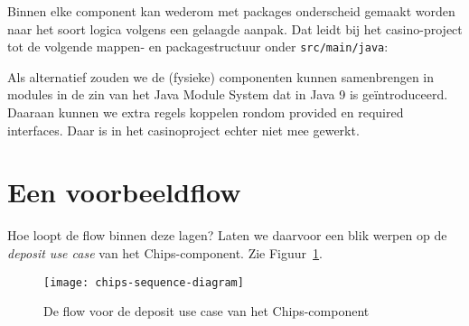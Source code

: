 Binnen elke component kan wederom met packages 
onderscheid gemaakt worden naar 
het soort logica volgens een gelaagde aanpak. 
Dat leidt bij het casino-project tot de volgende 
mappen- en packagestructuur onder \texttt{src/main/java}:


Als alternatief zouden we de (fysieke) componenten kunnen samenbrengen in 
modules in de zin van het Java Module System dat in Java 9 is geïntroduceerd.
Daaraan kunnen we extra regels koppelen rondom provided en required interfaces.
Daar is in het casinoproject echter niet mee gewerkt.

\section{Een voorbeeldflow}
Hoe loopt de flow binnen deze lagen? Laten we daarvoor een blik werpen 
op de \emph{deposit use case} van het Chips-component. 
Zie Figuur~\ref{fig:chips-sequence-diagram}.

\begin{figure}[H]
    \centering
    \texttt{[image: chips-sequence-diagram]}
    \caption{De flow voor de deposit use case van het Chips-component}
    \label{fig:chips-sequence-diagram}
\end{figure}

